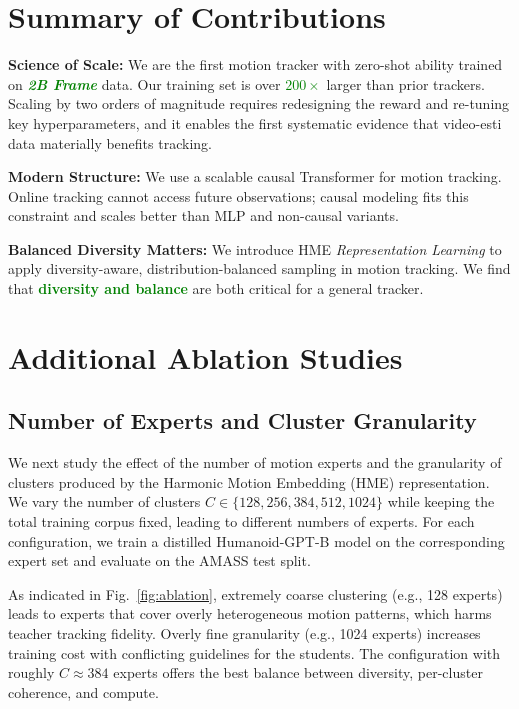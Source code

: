 \newpage
\clearpage

\section{Summary of Contributions}

\noindent\textbf{Science of Scale:}
We are the first motion tracker with zero-shot ability trained on \textcolor{green}{\textbf{\emph{2B Frame}}} data.
Our training set is over \textcolor{green}{\textbf{$200\times$}} larger than prior trackers.
Scaling by two orders of magnitude requires redesigning the reward and re-tuning key hyperparameters, and it enables the first systematic evidence that video-esti data materially benefits tracking.

\vspace{1.5pt}
\noindent\textbf{Modern Structure:}
We use a scalable causal Transformer for motion tracking. Online tracking cannot access future observations; causal modeling fits this constraint and scales better than MLP and non-causal variants.

\vspace{1.5pt}
\noindent\textbf{Balanced Diversity Matters:}
We introduce HME \textit{Representation Learning} to apply diversity-aware, distribution-balanced sampling in motion tracking. We find that \textcolor{green}{\textbf{diversity and balance}} are both critical for a general tracker.

\section{Additional Ablation Studies}
\label{sec:ablations_pipeline}

\subsection{Number of Experts and Cluster Granularity}
\label{subsec:num_experts}

We next study the effect of the number of motion experts and the granularity of clusters produced by the Harmonic Motion Embedding (HME) representation.
We vary the number of clusters $C \in \{128, 256, 384, 512, 1024\}$ while keeping the total training corpus fixed, leading to different numbers of experts.
For each configuration, we train a distilled Humanoid-GPT-B model on the corresponding expert set and evaluate on the AMASS test split.

As indicated in Fig.~\ref{fig:ablation}, extremely coarse clustering (e.g., 128 experts) leads to experts that cover overly heterogeneous motion patterns, which harms teacher tracking fidelity.
Overly fine granularity (e.g., 1024 experts) increases training cost with conflicting guidelines for the students.
The configuration with roughly $C \approx 384$ experts offers the best balance between diversity, per-cluster coherence, and compute.


